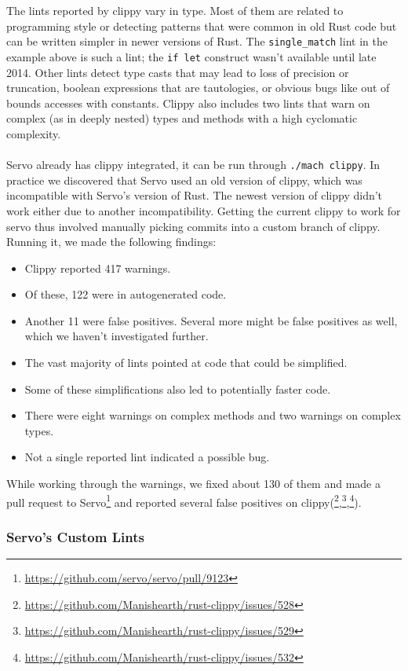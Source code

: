 \documentclass{scrartcl}
\begin{document}
The lints reported by clippy vary in type. Most of them are related to programming style or detecting patterns that were common in old Rust code but can be written simpler in newer versions of Rust. The \texttt{single\_match} lint in the example above is such a lint; the \texttt{if let} construct wasn't available until late 2014. Other lints detect type casts that may lead to loss of precision or truncation, boolean expressions that are tautologies, or obvious bugs like out of bounds accesses with constants. Clippy also includes two lints that warn on complex (as in deeply nested) types and methods with a high cyclomatic complexity.\\
\\
Servo already has clippy integrated, it can be run through \texttt{./mach clippy}. In practice we discovered that Servo used an old version of clippy, which was incompatible with Servo's version of Rust. The newest version of clippy didn't work either due to another incompatibility. Getting the current clippy to work for servo thus involved manually picking commits into a custom branch of clippy. Running it, we made the following findings: 
\begin{itemize}
	\item Clippy reported 417 warnings.
    \item Of these, 122 were in autogenerated code.
    \item Another 11 were false positives. Several more might be false positives as well, which we haven't investigated further.
    \item The vast majority of lints pointed at code that could be simplified.
    \item Some of these simplifications also led to potentially faster code.
    \item There were eight warnings on complex methods and two warnings on complex types.
    \item Not a single reported lint indicated a possible bug.
\end{itemize}

While working through the warnings, we fixed about 130 of them and made a pull request to Servo\footnote{\url{https://github.com/servo/servo/pull/9123}} and reported several false positives on clippy(\footnote{\url{https://github.com/Manishearth/rust-clippy/issues/528}},\footnote{\url{https://github.com/Manishearth/rust-clippy/issues/529}},\footnote{\url{https://github.com/Manishearth/rust-clippy/issues/532}}).


\subsubsection{Servo's Custom Lints}
\end{document}
